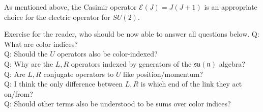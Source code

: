 \documentclass[10pt,reqno]{amsart}
\numberwithin{equation}{section}
\begin{document}
	As mentioned above, the Casimir operator $\mathcal{E}(J)=J(J+1)$ is an appropriate choice for the electric operator for $SU(2)$.


	Exercise for the reader, who should be now able to answer all questions below.
	\noindent Q: What are color indices?\\
	Q: Should the $U$ operators also be color-indexed?\\
	Q: Why are the $L,R$ operators indexed by generators of the $\mathfrak{su(n)}$ algebra?\\
	Q: Are $L,R$ conjugate operators to $U$ like position/momentum?\\
	Q: I think the only difference between $L,R$ is which end of the link they act on/from?\\
	Q: Should other terms also be understood to be sums over color indices?

	
	
	
	\nocite{Hamer82}
	\nocite{AKHvD11}
	\nocite{Zohar_2015}
\end{document}
